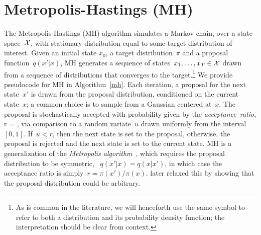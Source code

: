 \documentclass[angelino.tex]{subfiles}
\begin{document}
\section{Metropolis-Hastings (MH)}




The Metropolis-Hastings (MH) algorithm simulates a Markov chain, over a
state space~${\mathcal X}$, with stationary distribution equal to some target
distribution of interest.
Given an initial state $x_0$, a target distribution~$\pi$ and
a proposal function~$q(x' \vert x)$,
MH generates a sequence of states~$x_1, \dots, x_T \in {\mathcal X}$
drawn from a sequence of distributions that converges to the target.\footnote{
As is common in the literature, we will henceforth use the same symbol
to refer to both a distribution and its probability density function;
the interpretation should be clear from context.}
We provide pseudocode for MH in Algorithm~\ref{mh}.
Each iteration, a proposal for the next state~$x'$ is drawn from the
proposal distribution, conditioned on the current state~$x$;
\eg a common choice is to sample from a Gaussian centered at~$x$.
The proposal is stochastically accepted with probability given by the 
\emph{acceptance~ratio},
\be
r = ,
\ee
via comparison to a random variate~$u$ drawn uniformly from the interval~$[0, 1]$.
If~${u < r}$, then the next state is set to the proposal, otherwise,
the proposal is rejected and the next state is set to the current state.
MH is a generalization of the \emph{Metropolis algorithm}~\citep{metropolis-1953}, 
which requires the proposal distribution to be symmetric,
\ie~${q(x' \vert x) = q(x \vert x')}$, in which case
the acceptance ratio is simply~${r = \pi(x') / \pi(x)}$.
\citet{hastings-1970} later relaxed this by showing that the proposal
distribution could be arbitrary.
\end{document}

